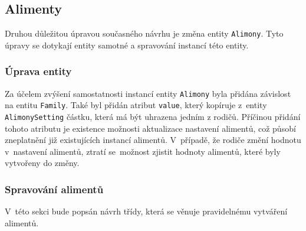     \subsection{Alimenty}\label{navrh:upravy:alimenty}
        Druhou důležitou úpravou současného návrhu je změna entity \verb|Alimony|. Tyto úpravy se dotykají entity samotné a spravování instancí této entity.
    
        \subsubsection{Úprava entity}
            Za účelem zvýšení samostatnosti instancí entity \verb|Alimony| byla přidána závislost na entitu \verb|Family|. Také byl přidán atribut \verb|value|, který kopíruje z~entity \verb|AlimonySetting| částku, která má být uhrazena jedním z rodičů. Příčinou přidání tohoto atributu je existence možnosti aktualizace nastavení alimentů, což působí zneplatnění již existujících instancí alimentů. V~případě, že rodiče změní hodnotu v~nastavení alimentů, ztratí se~možnost zjistit hodnoty alimentů, které byly vytvořeny do změny.
            
        \subsubsection{Spravování alimentů} 
            V~této sekci bude popsán návrh třídy, která se věnuje pravidelnému vytváření alimentů.
            
